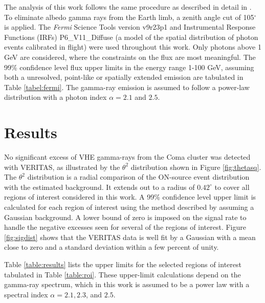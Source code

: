 \documentclass[12pt,manuscript]{aastex}
\begin{document}
The analysis of this work follows the same procedure as described in detail in \citet{article:Abdo_etal:2009}. To eliminate albedo gamma rays from the Earth limb, a zenith angle cut of 105$^{\circ}$ is applied. The \emph{Fermi} Science Tools version v9r23p1 and Instrumental Response Functions (IRFs) P6\_V11\_Diffuse (a model of the spatial distribution of photon events calibrated  in flight) were used throughout this work. Only photons above 1 GeV are considered, where the constraints on the flux are most meaningful. The 99\% confidence level flux upper limits in the energy range 1-100 GeV, assuming both a unresolved, point-like or spatially extended emission are tabulated in Table \ref{tabel:fermi}. The gamma-ray emission is assumed to follow a power-law distribution with a photon index $\alpha=2.1$ and $2.5$.

\section{Results}
No significant excess of VHE gamma-rays from the Coma cluster was detected with VERITAS, as illustrated by the $\theta^{2}$ distribution shown in Figure \ref{fig:thetasq}. The $\theta^{2}$ distribution is a radial comparison of the ON-source event distribution with the estimated background. It extends out to a radius of $0.42^{\circ}$ to cover all regions of interest considered in this work. A 99\% confidence level upper limit is calculated for each region of interest using the method described by \citet{article:Rolke_etal:2005} assuming a Gaussian background. A lower bound of zero is imposed on the signal rate to handle the negative excesses seen for several of the regions of interest. Figure \ref{fig:sigdist} shows that the VERITAS data is well fit by a Gaussian with a mean close to zero and a standard deviation within a few percent of unity. 

Table \ref{table:results} lists the upper limits for the selected regions of interest tabulated in Table \ref{table:roi}. These upper-limit calculations depend on the gamma-ray spectrum, which in this work is assumed to be a power law with a spectral index $\alpha=2.1, 2.3$, and $2.5$.
\end{document}
